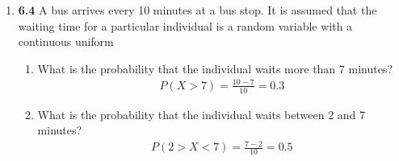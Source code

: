 \documentclass[basic, header]{nosvagor-notes}
\begin{document}
\begin{enumerate}[leftmargin=1.5em, itemsep=2em]
\begin{enumerate}[leftmargin=1.6em]
    \end{enumerate}

  \item \textbf{6.4} A bus arrives every 10 minutes at a bus stop. It is
    assumed that the waiting time for a particular individual is a random
    variable with a continuous uniform
    \begin{enumerate}[leftmargin=1.6em]

      \item What is the probability that the individual waits more than 7
        minutes?
        \begin{align*}
          P(X > 7) = \frac{10-7}{10} = \boxed{0.3}
        \end{align*}

      \item  What is the probability that the individual waits between 2 and 7
        minutes?
        \begin{align*}
          P(2 > X < 7) = \frac{7-2}{10} = \boxed{0.5}
        \end{align*}

    \end{enumerate}

\end{enumerate}
\end{document}
